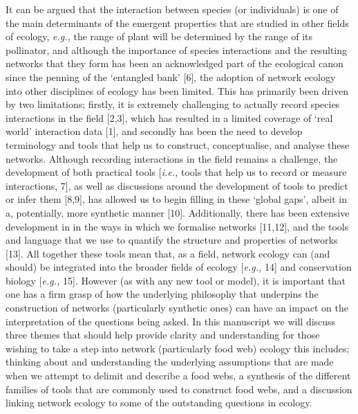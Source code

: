 \documentclass[
]{article}
\begin{document}
It can be argued that the interaction between species (or individuals)
is one of the main determinants of the emergent properties that are
studied in other fields of ecology, \emph{e.g.,} the range of plant will
be determined by the range of its pollinator, and although the
importance of species interactions and the resulting networks that they
form has been an acknowledged part of the ecological canon since the
penning of the `entangled bank' {[}6{]}, the adoption of network ecology
into other disciplines of ecology has been limited. This has primarily
been driven by two limitations; firstly, it is extremely challenging to
actually record species interactions in the field {[}2,3{]}, which has
resulted in a limited coverage of `real world' interaction data {[}1{]},
and secondly has been the need to develop terminology and tools that
help us to construct, conceptualise, and analyse these networks.
Although recording interactions in the field remains a challenge, the
development of both practical tools {[}\emph{i.e.,} tools that help us
to record or measure interactions, 7{]}, as well as discussions around
the development of tools to predict or infer them {[}8,9{]}, has allowed
us to begin filling in these `global gaps', albeit in a, potentially,
more synthetic manner {[}10{]}. Additionally, there has been extensive
development in in the ways in which we formalise networks {[}11,12{]},
and the tools and language that we use to quantify the structure and
properties of networks {[}13{]}. All together these tools mean that, as
a field, network ecology can (and should) be integrated into the broader
fields of ecology {[}\emph{e.g.,} 14{]} and conservation biology
{[}\emph{e.g.,} 15{]}. However (as with any new tool or model), it is
important that one has a firm grasp of how the underlying philosophy
that underpins the construction of networks (particularly synthetic
ones) can have an impact on the interpretation of the questions being
asked. In this manuscript we will discuss three themes that should help
provide clarity and understanding for those wishing to take a step into
network (particularly food web) ecology this includes; thinking about
and understanding the underlying assumptions that are made when we
attempt to delimit and describe a food webs, a synthesis of the
different families of tools that are commonly used to construct food
webs, and a discussion linking network ecology to some of the
outstanding questions in ecology.
\end{document}
